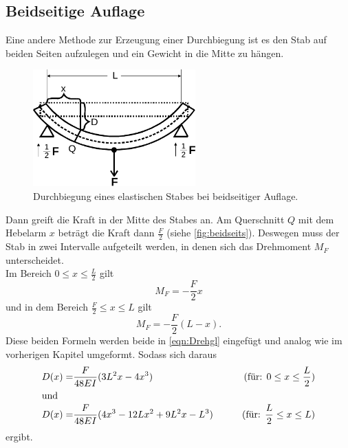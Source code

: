 \subsection{Beidseitige Auflage}

Eine andere Methode zur Erzeugung einer Durchbiegung ist es den Stab auf beiden Seiten aufzulegen und ein Gewicht in die Mitte zu hängen.
\begin{figure}[H]
  \centering
  \includegraphics[height=4.5cm]{content/beidseits.pdf}
  \caption{Durchbiegung eines elastischen Stabes bei beidseitiger Auflage.\cite[110]{V103}}
  \label{fig:beidseits}
\end{figure}
\noindent Dann greift die Kraft in der Mitte des Stabes an.
Am Querschnitt $Q$ mit dem Hebelarm $x$ beträgt die Kraft dann $\frac{F}{2}$ (siehe \autoref{fig:beidseits}). 
Deswegen muss der Stab in zwei Intervalle aufgeteilt werden, in denen sich das Drehmoment $M_F$ unterscheidet.\\
Im Bereich $ 0 \leq x \leq \frac{L}{2}$ gilt
\begin{equation}
  M_F = -\frac{F}{2}x
  \label{eqn:M_F1}
\end{equation}
und in dem Bereich $\frac{F}{2} \leq x \leq L$ gilt
\begin{equation}
  M_F = -\frac{F}{2}(L-x).
  \label{eqn:M_F2}
\end{equation}
Diese beiden Formeln werden beide in \autoref{eqn:Drehgl} eingefügt und analog wie im vorherigen Kapitel umgeformt.
Sodass sich daraus
\begin{align}
   D(x) = &\frac{F}{48EI}(3L^2x - 4x^3) &\qquad (\text{für: } 0 \leq x \leq \frac{L}{2})\label{eqn:Biegungbl}\\
\shortintertext{und}
   D(x) = &\frac{F}{48EI}(4x^3 - 12Lx^2 + 9L^2x -L^3) &\qquad (\text{für: } \frac{L}{2} \leq x \leq L)\label{eqn:Biegungbr}
\end{align}
ergibt.







